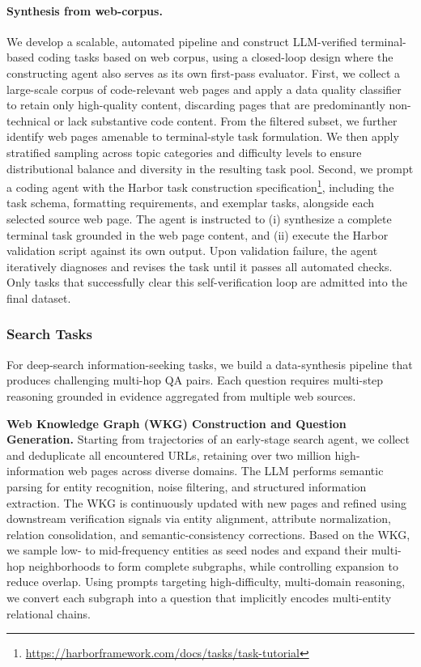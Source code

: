 \documentclass{article}
\theoremstyle{definition}
\begin{document}
\paragraph{Synthesis from web-corpus.}
We develop a scalable, automated pipeline and construct LLM-verified terminal-based coding tasks based on web corpus, using a closed-loop design where the constructing agent also serves as its own first-pass evaluator.
First, we collect a large-scale corpus of code-relevant web pages and apply a data quality classifier to retain only high-quality content, discarding pages that are predominantly non-technical or lack substantive code content. From the filtered subset, we further identify web pages amenable to terminal-style task formulation. We then apply stratified sampling across topic categories and difficulty levels to ensure distributional balance and diversity in the resulting task pool.
Second, we prompt a coding agent with the Harbor task construction specification\footnote{\url{https://harborframework.com/docs/tasks/task-tutorial}}, including the task schema, formatting requirements, and exemplar tasks, alongside each selected source web page. The agent is instructed to (i) synthesize a complete terminal task grounded in the web page content, and (ii) execute the Harbor validation script against its own output. Upon validation failure, the agent iteratively diagnoses and revises the task until it passes all automated checks. Only tasks that successfully clear this self-verification loop are admitted into the final dataset.

\subsubsection{Search Tasks}

For deep-search information-seeking tasks, we build a data-synthesis pipeline that produces challenging multi-hop QA pairs. Each question requires multi-step reasoning grounded in evidence aggregated from multiple web sources.

\textbf{Web Knowledge Graph (WKG) Construction and Question Generation.}
Starting from trajectories of an early-stage search agent, we collect and deduplicate all encountered URLs, retaining over two million high-information web pages across diverse domains. 
The LLM performs semantic parsing for entity recognition, noise filtering, and structured information extraction. 
The WKG is continuously updated with new pages and refined using downstream verification signals via entity alignment, attribute normalization, relation consolidation, and semantic-consistency corrections. 
Based on the WKG, we sample low- to mid-frequency entities as seed nodes and expand their multi-hop neighborhoods to form complete subgraphs, while controlling expansion to reduce overlap. 
Using prompts targeting high-difficulty, multi-domain reasoning, we convert each subgraph into a question that implicitly encodes multi-entity relational chains. 
\end{document}
